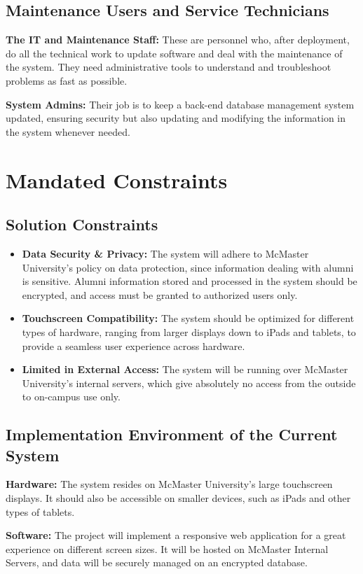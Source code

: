 \documentclass[12pt]{article}
\begin{document}
\subsection{Maintenance Users and Service Technicians}
\textbf{The IT and Maintenance Staff:} These are personnel who, after deployment, do all the technical work to update software and deal with the maintenance of the system. They need administrative tools to understand and troubleshoot problems as fast as possible. \par
\textbf{System Admins:} Their job is to keep a back-end database management system updated, ensuring security but also updating and modifying the information in the system whenever needed.
\section{Mandated Constraints}

\subsection{Solution Constraints}
\begin{itemize}
  \item \textbf{Data Security \& Privacy:} The system will adhere to McMaster University's policy on data protection, since information dealing with alumni is sensitive. Alumni information stored and processed in the system should be encrypted, and access must be granted to authorized users only.
  \item \textbf{Touchscreen Compatibility:} The system should be optimized for different types of hardware, ranging from larger displays down to iPads and tablets, to provide a seamless user experience across hardware.
  \item \textbf{Limited in External Access:} The system will be running over McMaster University's internal servers, which give absolutely no access from the outside to on-campus use only.
\end{itemize}

\subsection{Implementation Environment of the Current System}
\textbf{Hardware:} The system resides on McMaster University's large touchscreen displays. It should also be accessible on smaller devices, such as iPads and other types of tablets.

\textbf{Software:} The project will implement a responsive web application for a great experience on different screen sizes. It will be hosted on McMaster Internal Servers, and data will be securely managed on an encrypted database.
\end{document}
